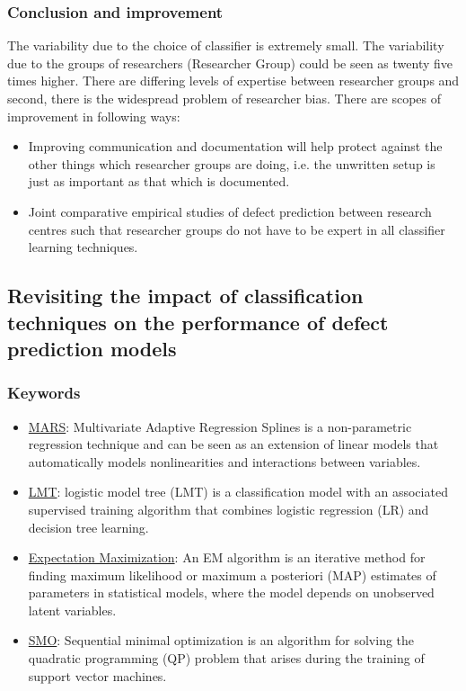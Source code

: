 \documentclass[conference]{IEEEtran}
\begin{document}
\subsubsection{\textbf{Conclusion and improvement}}
The variability due to the choice of classifier is extremely small. The variability due to the groups of researchers (Researcher Group) could be seen as twenty five times higher. There are differing levels of expertise between researcher groups and second, there is the widespread problem of researcher bias.
There are scopes of improvement in following ways:
\begin{itemize}
    \item Improving communication and documentation will help protect against the other things which researcher groups are doing, i.e. the unwritten setup is just as important as that which is documented.
    \item Joint comparative empirical studies of defect prediction
between research centres such that researcher
groups do not have to be expert in all classifier
learning techniques.
\end{itemize}

\subsection{\textbf{Revisiting the impact of classification techniques on the performance of defect prediction models~\cite{ghotra2015revisiting}}}
\subsubsection{\textbf{Keywords}}
\begin{itemize}
    \item \underline{MARS}: Multivariate Adaptive Regression Splines is a non-parametric regression technique and can be seen as an extension of linear models that automatically models nonlinearities and interactions between variables.
    \item \underline{LMT}: logistic model tree (LMT) is a classification model with an associated supervised training algorithm that combines logistic regression (LR) and decision tree learning.
    \item \underline{Expectation Maximization}: An EM algorithm is an iterative method for finding maximum likelihood or maximum a posteriori (MAP) estimates of parameters in statistical models, where the model depends on unobserved latent variables.
    \item \underline{SMO}: Sequential minimal optimization is an algorithm for solving the quadratic programming (QP) problem that arises during the training of support vector machines.
\end{itemize}
\end{document}
